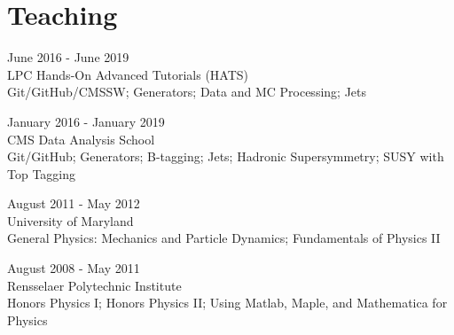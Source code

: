 \section{Teaching}
\begin{description}[leftmargin=12pt,font=\normalfont\textit]
\item[Facilitator] \hfill June 2016 - June 2019\\
LPC Hands-On Advanced Tutorials (HATS)\\
Git/GitHub/CMSSW; Generators; Data and MC Processing; Jets
\item[Facilitator] \hfill January 2016 - January 2019\\
CMS Data Analysis School\\
Git/GitHub; Generators; B-tagging; Jets; Hadronic Supersymmetry; SUSY with Top Tagging
\item[Graduate Teaching Assistant] \hfill August 2011 - May 2012\\
University of Maryland\\
General Physics: Mechanics and Particle Dynamics; Fundamentals of Physics II
\item[Undergraduate Teaching Assistant] \hfill August 2008 - May 2011\\
Rensselaer Polytechnic Institute\\
Honors Physics I; Honors Physics II; Using Matlab, Maple, and Mathematica for Physics
\end{description}